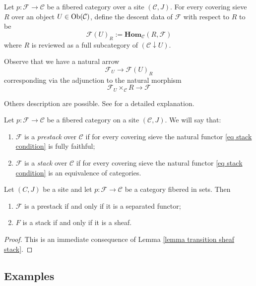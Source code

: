 \begin{defin}
Let $p \colon \mathcal F \to \mathcal C$ be a fibered category over a site $(\mathcal C,J)$. For every covering sieve $R$ over an object $U \in \mathrm{Ob}(\mathcal C)$, define the descent data of $\mathcal F$ with respect to $R$ to be
\[
\mathcal F(U)_R := \mathbf{Hom}_{\mathcal C}(R, \mathcal F)
\]
where $R$ is reviewed as a full subcategory of $(\mathcal C \downarrow U)$.
\end{defin}

Observe that we have a natural arrow
\begin{equation} \label{eq stack condition}
\mathcal F_U \to \mathcal F(U)_R
\end{equation}
corresponding via the adjunction to the natural morphism
\[
\mathcal F_U \times_{\mathcal C} R \to \mathcal F
\]

Others description are possible. See \cite[Ch. 4.1.2]{vistoli} for a detailed explanation.

\begin{defin}
Let $p \colon \mathcal F \to \mathcal C$ be a fibered category on a site $(\mathcal C,J)$. We will say that:
\begin{enumerate}
\item $\mathcal F$ is a \emph{prestack} over $\mathcal C$ if for every covering sieve the natural functor \eqref{eq stack condition} is fully faithful;
\item $\mathcal F$ is a \emph{stack} over $\mathcal C$ if for every covering sieve the natural functor \eqref{eq stack condition} is an equivalence of categories.
\end{enumerate}
\end{defin}

\begin{prop}
Let $(C,J)$ be a site and let $p \colon \mathcal F \to \mathcal C$ be a category fibered in sets. Then
\begin{enumerate}
\item $\mathcal F$ is a prestack if and only if it is a separated functor;
\item $F$ is a stack if and only if it is a sheaf.
\end{enumerate}
\end{prop}

\begin{proof}
This is an immediate consequence of Lemma \ref{lemma transition sheaf stack}.
\end{proof}

\subsection{Examples}

